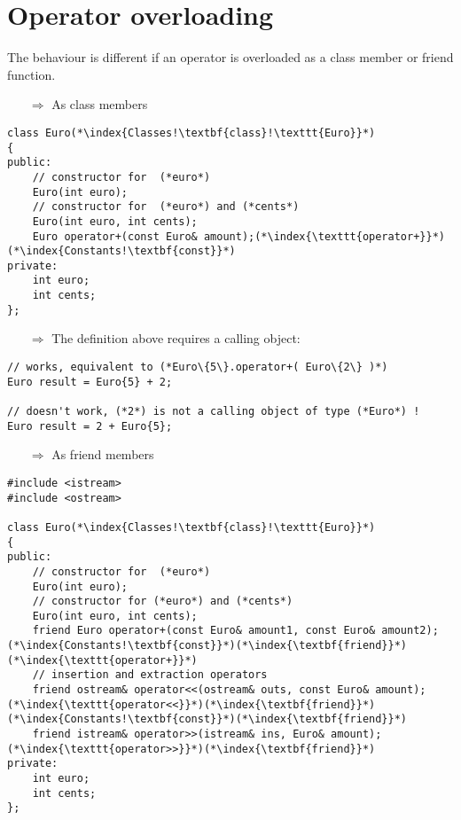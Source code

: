 \documentclass[10pt]{article}
\begin{document}
\section{Operator overloading}
\small
The behaviour is different if an operator is overloaded as  a class member or 
friend function.
\begin{enumerate}
\item[$\Rightarrow$] As class members
\end{enumerate}
\begin{lstlisting}
class Euro(*\index{Classes!\textbf{class}!\texttt{Euro}}*)
{
public:
    // constructor for  (*euro*)
    Euro(int euro);
    // constructor for  (*euro*) and (*cents*)
    Euro(int euro, int cents);
    Euro operator+(const Euro& amount);(*\index{\texttt{operator+}}*)(*\index{Constants!\textbf{const}}*)
private:
    int euro;
    int cents;
};
\end{lstlisting}
\begin{enumerate}
\item[$\Rightarrow$] The definition above requires a calling object:
\end{enumerate}
\begin{lstlisting}
// works, equivalent to (*Euro\{5\}.operator+( Euro\{2\} )*)
Euro result = Euro{5} + 2; 

// doesn't work, (*2*) is not a calling object of type (*Euro*) !
Euro result = 2 + Euro{5}; 
\end{lstlisting}
\begin{enumerate}
\item[$\Rightarrow$] As friend members
\end{enumerate}
\begin{lstlisting}
#include <istream>
#include <ostream>

class Euro(*\index{Classes!\textbf{class}!\texttt{Euro}}*)
{
public:
    // constructor for  (*euro*)
    Euro(int euro);
    // constructor for (*euro*) and (*cents*)
    Euro(int euro, int cents);
    friend Euro operator+(const Euro& amount1, const Euro& amount2);(*\index{Constants!\textbf{const}}*)(*\index{\textbf{friend}}*)(*\index{\texttt{operator+}}*)
    // insertion and extraction operators
    friend ostream& operator<<(ostream& outs, const Euro& amount);(*\index{\texttt{operator<<}}*)(*\index{\textbf{friend}}*)(*\index{Constants!\textbf{const}}*)(*\index{\textbf{friend}}*)
    friend istream& operator>>(istream& ins, Euro& amount);(*\index{\texttt{operator>>}}*)(*\index{\textbf{friend}}*)
private:
    int euro;
    int cents;
};
\end{lstlisting}
\end{document}
